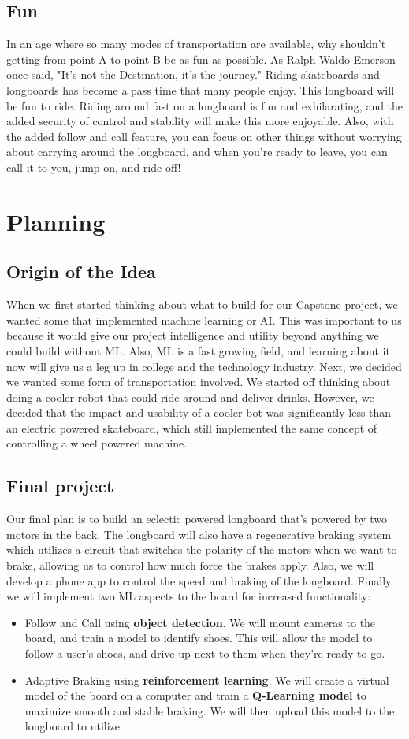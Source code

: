 \documentclass{article}
\begin{document}
\subsection{Fun}
In an age where so many modes of transportation are available, why shouldn't getting from point A to point B be as fun as possible. As Ralph Waldo Emerson once said, "It's not the Destination, it's the journey." Riding skateboards and longboards has become a pass time that many people enjoy. This longboard will be fun to ride. Riding around fast on a longboard is fun and exhilarating, and the added security of control and stability will make this more enjoyable. Also, with the added follow and call feature, you can focus on other things without worrying about carrying around the longboard, and when you're ready to leave, you can call it to you, jump on, and ride off!

\section{Planning}
\subsection{Origin of the Idea}
When we first started thinking about what to build for our Capstone project, we wanted some that implemented machine learning or AI. This was important to us because it would give our project intelligence and utility beyond anything we could build without ML. Also, ML is a fast growing field, and learning about it now will give us a leg up in college and the technology industry. Next, we decided we wanted some form of transportation involved. We started off thinking about doing a cooler robot that could ride around and deliver drinks. However, we decided that the impact and usability of a cooler bot was significantly less than an electric powered skateboard, which still implemented the same concept of controlling a wheel powered machine.
\subsection{Final project}
Our final plan is to build an eclectic powered longboard that's powered by two motors in the back. The longboard will also have a regenerative braking system which utilizes a circuit that switches the polarity of the motors when we want to brake, allowing us to control how much force the brakes apply. Also, we will develop a phone app to control the speed and braking of the longboard. Finally, we will implement two ML aspects to the board for increased functionality:
\begin{itemize}
  \item Follow and Call using \textbf{object detection}. We will mount cameras to the board, and train a model to identify shoes. This will allow the model to follow a user's shoes, and drive up next to them when they're ready to go.
  \item Adaptive Braking using \textbf{reinforcement learning}. We will create a virtual model of the board on a computer and train a \textbf{Q-Learning model} to maximize smooth and stable braking. We will then upload this model to the longboard to utilize.
\end{itemize}
\end{document}
